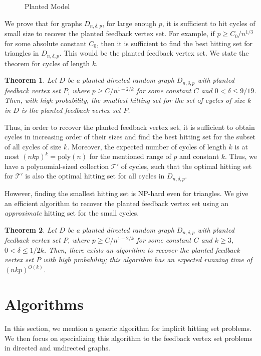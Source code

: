 \documentclass[11pt]{article}
\newtheorem{theorem}{Theorem}
\def\T{\mathcal{T}}
\begin{document}
\begin{figure}[H]
\label{fig:planted-model}
\begin{center}
\end{center}
\caption{Planted Model}
\end{figure}

We prove that for graphs $D_{n,\delta,p}$, for large enough $p$, it is sufficient to hit cycles of small size to recover the planted feedback vertex set. For example, if $p\geq C_0/n^{1/3}$ for some absolute constant $C_0$, then it is sufficient to find the best hitting set for triangles in $D_{n,\delta,p}$. This would be the planted feedback vertex set. We state the theorem for cycles of length $k$.
\begin{theorem}\label{theorem:planted-directedFVS}
Let $D$ be a planted directed random graph $D_{n,\delta,p}$ with planted feedback vertex set $P$, where $p\geq C/n^{1-2/k}$ for some constant $C$ and $0<\delta\leq 9/19$. Then, with high probability, the smallest hitting set for the set of cycles of size $k$ in $D$ is the planted feedback vertex set $P$.
\end{theorem}
Thus, in order to recover the planted feedback vertex set, it is sufficient to obtain cycles in increasing order of their sizes and find the best hitting set for the subset of all cycles of size $k$. Moreover, the expected number of cycles of length $k$ is at most $(nkp)^{k}=\text{poly}(n)$ for the mentioned range of $p$ and constant $k$. Thus, we have a polynomial-sized collection $\T'$ of cycles, such that the optimal hitting set for $\T'$ is also the optimal hitting set for all cycles in $D_{n,\delta,p}$.

However, finding the smallest hitting set is NP-hard even for triangles. We give an efficient algorithm to recover the planted feedback vertex set using an \emph{approximate} hitting set for the small cycles.
\begin{theorem}\label{theorem:algorithm-planted-directedFVS}
Let $D$ be a planted directed random graph $D_{n,\delta,p}$ with planted feedback vertex set $P$, where $p\geq C/n^{1-2/k}$ for some constant $C$ and $k\geq 3$, $0<\delta\leq 1/2k$. Then, there exists an algorithm to recover the planted feedback vertex set $P$ with high probability; this algorithm has an expected running time of $(nkp)^{O(k)}$.
\end{theorem}

\section{Algorithms}
In this section, we mention a generic algorithm for implicit hitting set problems. We then focus on specializing this algorithm to the feedback vertex set problems in directed and undirected graphs.
\end{document}
